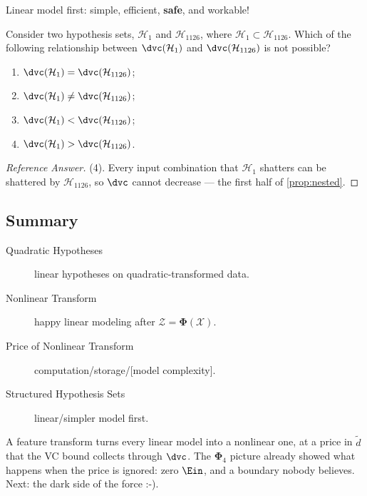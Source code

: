 \begin{moral}
    Linear model first: simple, efficient, \textbf{safe}, and workable!
\end{moral}

\begin{exercise}
    Consider two hypothesis sets, \(\mathcal{H}_1\) and \(\mathcal{H}_{1126}\),
    where \(\mathcal{H}_1 \subset \mathcal{H}_{1126}\). Which of the following
    relationship between \(\dvc(\mathcal{H}_1)\) and
    \(\dvc(\mathcal{H}_{1126})\) is not possible?
    \begin{enumerate}[(1)]
        \item \(\dvc(\mathcal{H}_1) = \dvc(\mathcal{H}_{1126})\);
        \item \(\dvc(\mathcal{H}_1) \neq \dvc(\mathcal{H}_{1126})\);
        \item \(\dvc(\mathcal{H}_1) < \dvc(\mathcal{H}_{1126})\);
        \item \(\dvc(\mathcal{H}_1) > \dvc(\mathcal{H}_{1126})\).
    \end{enumerate}
\end{exercise}

\begin{proof}[Reference Answer]
    (4). Every input combination that \(\mathcal{H}_1\) shatters can be
    shattered by \(\mathcal{H}_{1126}\), so \(\dvc\) cannot decrease --- the
    first half of \autoref{prop:nested}.
\end{proof}

\hrulebar

\subsection*{Summary}

\begin{description}
    \item[Quadratic Hypotheses] linear hypotheses on quadratic-transformed
        data.
    \item[Nonlinear Transform] happy linear modeling after \(\mathcal{Z} =
        \bm{\Phi}(\mathcal{X})\).
    \item[Price of Nonlinear Transform] computation/storage/[model
        complexity].
    \item[Structured Hypothesis Sets] linear/simpler model first.
\end{description}

A feature transform turns every linear model into a nonlinear one, at a price
in \(\tilde{d}\) that the VC bound collects through \(\dvc\). The \(\bm{\Phi}_4\)
picture already showed what happens when the price is ignored: zero \(\Ein\),
and a boundary nobody believes. Next: the dark side of the force :-).
